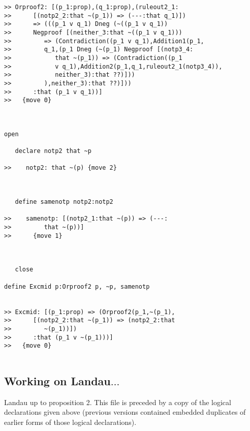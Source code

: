 \begin{verbatim}
>> Orproof2: [(p_1:prop),(q_1:prop),(ruleout2_1:
>>      [(notp2_2:that ~(p_1)) => (---:that q_1)])
>>      => (((p_1 v q_1) Dneg (~((p_1 v q_1))
>>      Negproof [(neither_3:that ~((p_1 v q_1)))
>>         => (Contradiction((p_1 v q_1),Addition1(p_1,
>>         q_1,(p_1 Dneg (~(p_1) Negproof [(notp3_4:
>>            that ~(p_1)) => (Contradiction((p_1
>>            v q_1),Addition2(p_1,q_1,ruleout2_1(notp3_4)),
>>            neither_3):that ??)]))
>>         ),neither_3):that ??)]))
>>      :that (p_1 v q_1))]
>>   {move 0}



open

   declare notp2 that ~p

>>    notp2: that ~(p) {move 2}



   define samenotp notp2:notp2

>>    samenotp: [(notp2_1:that ~(p)) => (---:
>>         that ~(p))]
>>      {move 1}



   close

define Excmid p:Orproof2 p, ~p, samenotp


>> Excmid: [(p_1:prop) => (Orproof2(p_1,~(p_1),
>>      [(notp2_2:that ~(p_1)) => (notp2_2:that
>>         ~(p_1))])
>>      :that (p_1 v ~(p_1)))]
>>   {move 0}


\end{verbatim}







\subsection{Working on Landau$\ldots$}

Landau up to proposition 2.   This file is preceded by a copy of the logical declarations given above (previous versions contained embedded duplicates
of earlier forms of those logical declarations).


